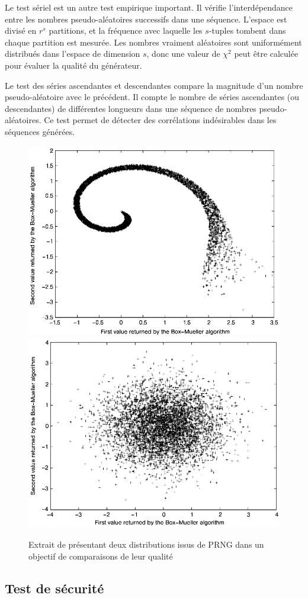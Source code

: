 \documentclass[9pt,a4paper,twoside,english]{class/backend}
\begin{document}
    Le test sériel est un autre test empirique important. Il vérifie l'interdépendance entre les nombres pseudo-aléatoires successifs dans une séquence. L'espace est divisé en $r^s$ partitions, et la fréquence avec laquelle les $s$-tuples tombent dans chaque partition est mesurée. Les nombres vraiment aléatoires sont uniformément distribués dans l'espace de dimension $s$, donc une valeur de $\chi^2$ peut être calculée pour évaluer la qualité du générateur.

    Le test des séries ascendantes et descendantes compare la magnitude d'un nombre pseudo-aléatoire avec le précédent. Il compte le nombre de séries ascendantes (ou descendantes) de différentes longueurs dans une séquence de nombres pseudo-aléatoires. Ce test permet de détecter des corrélations indésirables dans les séquences générées. 

     \begin{figure}[h]
        \includegraphics[width=0.5\linewidth]{figures/test_BadPRNG.png}
        \includegraphics[width=0.5\linewidth]{figures/test_GoodPRNG.png}
        \caption{Extrait de  présentant deux distributions issus de PRNG dans un objectif de comparaisons de leur qualité}
        \label{fig:PRNG}
    \end{figure}
    
    \subsection{Test de sécurité}
\end{document}
